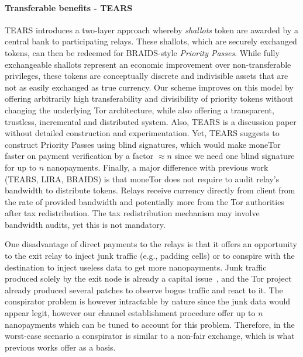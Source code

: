 \paragraph*{Transferable benefits - TEARS} TEARS introduces a two-layer approach whereby \emph{shallots}
token are awarded by a central bank to participating relays. These shallots,
which are securely exchanged tokens, can then be redeemed for BRAIDS-style
\emph{Priority Passes}. While fully exchangeable shallots represent an economic
improvement over non-transferable privileges, these tokens are conceptually
discrete and indivisible assets that are not as easily exchanged as true
currency. Our scheme improves on this model by offering arbitrarily high
transferability and divisibility of priority tokens without changing the
underlying Tor architecture, while also offering a transparent, trustless, incremental and distributed system. Also, TEARS is a discussion paper without detailed construction and experimentation. Yet, TEARS suggests to construct Priority Passes using blind signatures, which would make moneTor faster on payment verification by a factor $\approx n$ since we need one blind signature for up to $n$ nanopayments. Finally, a major difference with previous work (TEARS, LIRA, BRAIDS) is that moneTor does not require to audit relay's bandwidth to distribute tokens. Relays receive currency directly from client from the rate of provided bandwidth and potentially more from the Tor authorities after tax redistribution. The tax redistribution mechanism may involve bandwidth audits, yet this is not mandatory.

One disadvantage of direct payments to the relays is that it offers 
an opportunity to the exit relay to inject junk traffic (e.g., 
padding cells) or to conspire with the destination to inject useless 
data to get more nanopayments. Junk traffic produced solely by the 
exit node is already a capital issue~\cite{rochet2018dropping}, and 
the Tor project already produced several patches to observe bogus 
traffic and react to it. The conspirator problem is however 
intractable by nature since the junk data would appear legit, 
however our channel establishment procedure offer up to $n$ 
nanopayments which can be tuned to account for this problem. 
Therefore, in the worst-case scenario a conspirator is similar to a 
non-fair exchange, which is what previous works offer as a basis.

